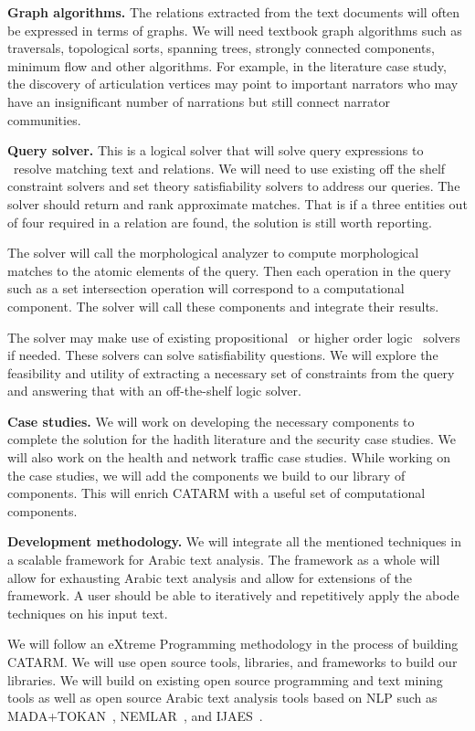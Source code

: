 \documentclass[12pt]{article}
\begin{document}
{\bf Graph algorithms.}
The relations extracted from the text documents will often 
be expressed in terms of graphs.
We will need textbook graph algorithms such as traversals, 
topological sorts, spanning trees, strongly connected 
components, minimum flow  and other algorithms.
For example, in the literature case study, the discovery
of articulation vertices may point to important narrators 
who may have an insignificant number of narrations 
but still connect narrator communities.

{\bf Query solver.}
This is a logical solver that will solve query expressions to \
resolve matching text and relations.
We will need to use existing off the shelf constraint solvers 
and set theory satisfiability solvers to address our queries. 
The solver should return and rank approximate matches.
That is if a three entities out of four required in a relation are
found, the solution is still worth reporting. 

The solver will call the morphological analyzer to compute 
morphological matches to the atomic elements of the query. 
Then each operation in the query such as a set intersection
operation will correspond to a computational component. 
The solver will call these components and integrate their
results. 

The solver may make use of existing propositional~\cite{MiniSAT} or
higher order logic~\cite{Z3} solvers if needed. 
These solvers can solve satisfiability questions.
We will explore the feasibility and utility 
of extracting a necessary set of 
constraints from the query and answering that with an off-the-shelf
logic solver. 

{\bf Case studies.}
We will work on developing the necessary components to complete 
the solution for the hadith literature and the security case 
studies.
We will also work on the health and network traffic case studies.
While working on the case studies, we will add the components
we build to our library of components. 
This will enrich CATARM with a useful set of computational 
components. 

{\bf Development methodology.}
We will integrate all the mentioned techniques in a scalable 
framework for Arabic text analysis.
The framework as a whole will allow for exhausting Arabic text 
analysis and allow for extensions of the framework.
A user should be able to iteratively and repetitively apply the 
abode techniques on his input text.

We will follow an eXtreme Programming 
methodology in the process of building CATARM.
We will use open source tools, libraries, and frameworks to 
build our libraries.
We will build on existing open source programming and text 
mining tools as well as open source Arabic text analysis tools 
based on NLP such as MADA+TOKAN~\cite{Rot08}, 
NEMLAR~\cite{RAl09}, and IJAES~\cite{Int09}.
\end{document}
